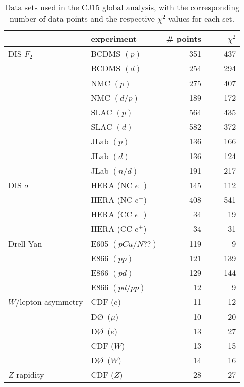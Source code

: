 \documentclass[aps,prd,amsmath,preprint]{revtex4}
\begin{document}
\begin{table}[tb]
\caption{Data sets used in the CJ15 global analysis, with the
	corresponding number of data points and the respective
	$\chi^2$ values for each set.\\}
\centering
{\scriptsize  
\begin{tabular}[c]{llrr}  \hline
  & experiment       			& \# points\!\!\!\!
					&\ \ \ \ $\chi^2$ \\ \hline
DIS $F_2$
  & BCDMS $(p)$ 	\cite{BCDMS}    & 351 & 437 \\
  & BCDMS $(d)$ 	\cite{BCDMS}    & 254 & 294 \\
  & NMC   $(p)$   	\cite{NMCp}     & 275 & 407 \\
  & NMC   $(d/p)$ 	\cite{NMCdop}   & 189 & 172 \\
  & SLAC  $(p)$  	\cite{SLAC}     & 564 & 435 \\
  & SLAC  $(d)$  	\cite{SLAC}     & 582 & 372 \\
  & JLab  $(p)$  	\cite{Malace}   & 136 & 166 \\
  & JLab  $(d)$  	\cite{Malace}   & 136 & 124 \\
  & JLab  $(n/d)$	\cite{BONuS}  	& 191 & 217 \\
DIS $\sigma$
  & HERA (NC $e^-$) 	\cite{HERA1}    & 145 & 112 \\
  & HERA (NC $e^+$) 	\cite{HERA1}    & 408 & 541 \\
  & HERA (CC $e^-$) 	\cite{HERA1}    &  34 &  19 \\
  & HERA (CC $e^+$) 	\cite{HERA1}    &  34 &  31 \\
Drell-Yan
  & E605 $(pCu/N??)$	\cite{E605}     & 119 &   9 \\ %
  & E866 $(pp)$		\cite{E866}     & 121 & 139 \\
  & E866 $(pd)$ 	\cite{E866}     & 129 & 144 \\
  & E866 $(pd/pp)$ 	\cite{E866rat}  &  12 &   9 \\
$W$/lepton asymmetry
  & CDF  ($e$)		\cite{CDF_e}    &  11 &  12 \\
  & D\O\ ($\mu$)  	\cite{D0_mu}    &  10 &  20 \\  
  & D\O\ ($e$) 		\cite{D0_e}     &  13 &  27 \\
  & CDF  ($W$)    	\cite{CDF_W}    &  13 &  15 \\
  & D\O\ ($W$)    	\cite{D0_W}     &  14 &  16 \\
$Z$ rapidity
  & CDF  ($Z$)		\cite{CDFZ}     &  28 &  27 \\ 

\end{tabular}}
\end{table}
\end{document}
